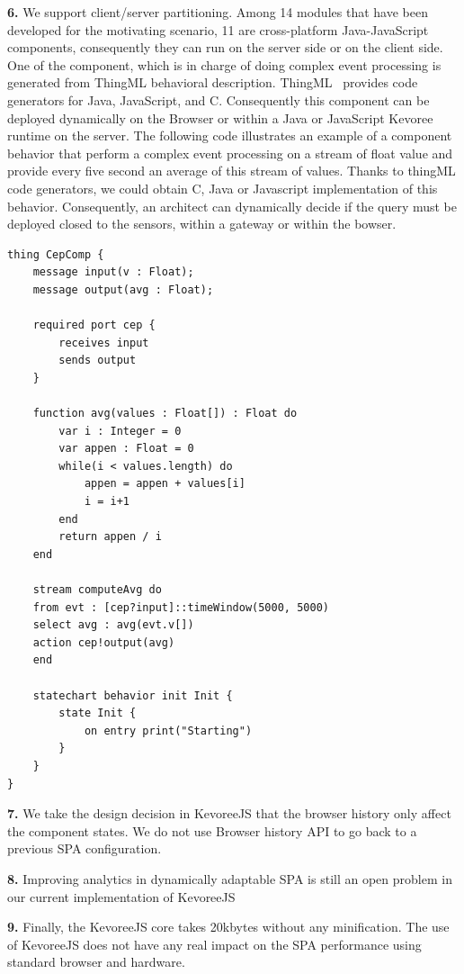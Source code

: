 \indent \textbf{6.} We support client/server partitioning. Among 14 modules that have been developed for the motivating scenario, 11 are cross-platform Java-JavaScript components, consequently they can run on the server side or on the client side.  One of the component, which is in charge of doing complex event processing is generated from ThingML behavioral description. ThingML~\cite{DBLP:conf/models/FleureyMSB11} provides code generators for Java, JavaScript, and C. Consequently this component can be deployed dynamically on the Browser or within a Java or JavaScript Kevoree runtime on the server.  The following code illustrates an example of a component behavior that perform a complex event processing on a stream of float value and provide every five second an average of this stream of values. Thanks to thingML code generators, we could obtain C, Java or Javascript implementation of this behavior. Consequently, an architect can dynamically decide if the query must be deployed closed to the sensors, within a gateway or within the bowser. 

\begin{lstlisting}[language=ThingML,frame=none,caption={Excerpt of a component implementation defined using ThingML}]
thing CepComp {
	message input(v : Float);
	message output(avg : Float);
	
	required port cep {
		receives input
		sends output	
	}
	
	function avg(values : Float[]) : Float do
		var i : Integer = 0
		var appen : Float = 0
		while(i < values.length) do
			appen = appen + values[i]
			i = i+1
		end
		return appen / i
	end
	
	stream computeAvg do
	from evt : [cep?input]::timeWindow(5000, 5000)
	select avg : avg(evt.v[])
	action cep!output(avg)
	end
	
	statechart behavior init Init {
		state Init {
			on entry print("Starting")			
		}
	}
}
\end{lstlisting}



\indent \textbf{7.} We take the design decision in KevoreeJS that the browser history only affect the component states. We do not use Browser history API to go back to a previous SPA configuration.

\indent \textbf{8.} Improving analytics in dynamically adaptable SPA is still an open problem in our current implementation of KevoreeJS

\indent \textbf{9.} Finally, the KevoreeJS core takes 20kbytes without any minification. The use of KevoreeJS does not have any real impact on the SPA performance using standard browser and hardware.
